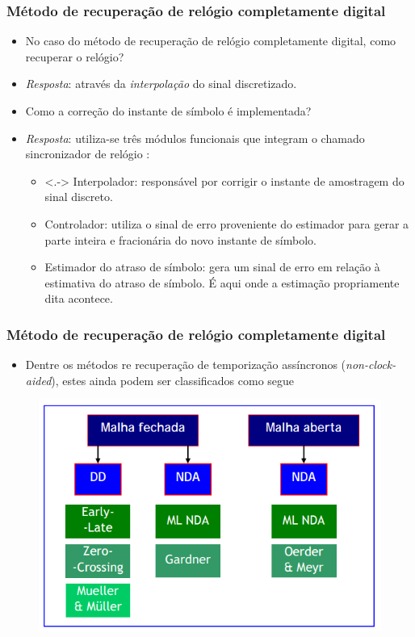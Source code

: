 \begin{frame}[t]
    \frametitle{Método de recuperação de relógio completamente digital}
    \begin{itemize}[<+->]
        \item No caso do método de recuperação de relógio completamente digital, como recuperar o relógio?
        \item \emph{Resposta}: através da \emph{interpolação} do sinal discretizado.
        \item Como a correção do instante de símbolo é implementada?
        \item \emph{Resposta}: utiliza-se três módulos funcionais que integram o chamado sincronizador de relógio \cite{abrantes2010recuperaccao}:
            \begin{itemize}
                \item<.-> Interpolador: responsável por corrigir o instante de amostragem do sinal discreto.
                \item Controlador: utiliza o sinal de erro proveniente do estimador para gerar a parte inteira e fracionária do novo instante de símbolo.
                \item Estimador do atraso de símbolo: gera um sinal de erro em relação à estimativa do atraso de símbolo. É aqui onde a estimação propriamente dita acontece.
            \end{itemize}
    \end{itemize}
\end{frame}

\begin{frame}[t]
	\frametitle{Método de recuperação de relógio completamente digital}
    \begin{itemize}
        \item Dentre os métodos re recuperação de temporização assíncronos (\textit{non-clock-aided}), estes ainda podem ser classificados como segue
    \end{itemize}
    \begin{figure}
        \includegraphics[scale=.45]{figs/tecnicas_estimacao.png}
    \end{figure}
\end{frame}

